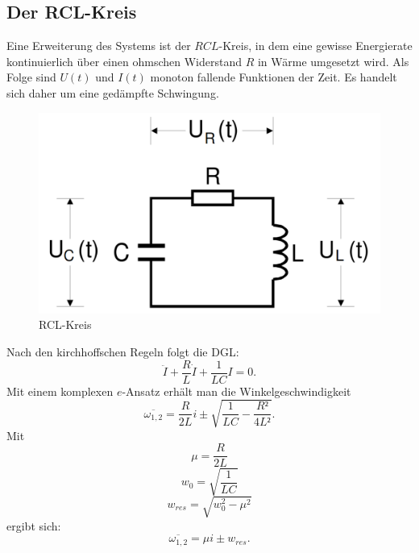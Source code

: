    \subsection{Der RCL-Kreis}
Eine Erweiterung des Systems ist der $RCL$-Kreis, in dem eine gewisse Energierate
kontinuierlich über einen ohmschen Widerstand $R$ in Wärme umgesetzt wird. Als Folge sind
$U(t)$ und $I(t)$  monoton fallende Funktionen der Zeit. Es handelt sich daher um eine gedämpfte
 Schwingung.
 \begin{figure}[H]
   \centering
   \includegraphics[width=\linewidth-200pt,height=\textheight-200pt,keepaspectratio]{content/RCL.png}
   \caption{RCL-Kreis}
   \label{fig:RCL_Kreis}
 \end{figure}
Nach den kirchhoffschen Regeln folgt die DGL:
 \begin{equation}
   \ddot{I} + \frac{R}{L} \dot{I} + \frac{1}{LC}I = 0\text{.}
 \end{equation}
 Mit einem komplexen $e$-Ansatz erhält man die Winkelgeschwindigkeit
 \begin{equation}
   \overline{\omega_{1,2}} = \frac{R}{2L}i \pm \sqrt{\frac{1}{LC}-\frac{R²}{4L²}}\text{.}
 \end{equation}
 Mit
 \begin{equation}
 \mu = \frac{R}{2L}
 \end{equation}
 \begin{equation}
 w_0 = \sqrt{\frac{1}{LC}}
 \end{equation}
 \begin{equation}
 w_{res} = \sqrt{w_0^2-\mu^2}
 \end{equation}
 ergibt sich:
 \begin{equation}
	 \overline{\omega_{1,2}} = \mu i \pm w_{res}\text{.}
 \end{equation}
 
